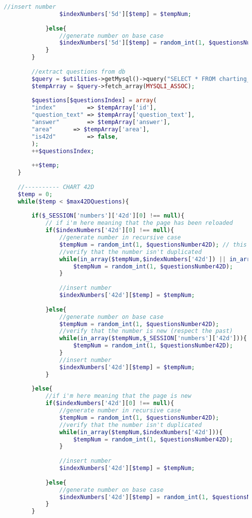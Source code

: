 \begin{lstlisting}[language=php]
				//insert number
				$indexNumbers['5d'][$temp] = $tempNum;
				
			}else{
				//generate number on base case
				$indexNumbers['5d'][$temp] = random_int(1, $questionsNumber5D);
			}
		}
		
		//extract questions from db
		$query = $utilities->getMysql()->query("SELECT * FROM charting_test_5d WHERE (id = '{$indexNumbers['5d'][$temp]}')");
		$tempArray = $query->fetch_array(MYSQLI_ASSOC);  
		
		$questions[$questionsIndex] = array(
		"index"         => $tempArray['id'],
		"question_text" => $tempArray['question_text'],
		"answer"        => $tempArray['answer'],
		"area"		=> $tempArray['area'],
		"is42d"         => false,
		);
		++$questionsIndex;
		
		++$temp;
	}
	
	//---------- CHART 42D
	$temp = 0;
	while($temp < $max42DQuestions){
		
		if($_SESSION['numbers']['42d'][0] !== null){
			// if i'm here meaning that the page has been reloaded     
			if($indexNumbers['42d'][0] !== null){
				//generate number in recursive case
				$tempNum = random_int(1, $questionsNumber42D); // this 1 is because i know that the questions starts form 1 into db
				//verify that the number isn't duplicated
				while(in_array($tempNum,$indexNumbers['42d']) || in_array($tempNum,$_SESSION['numbers']['42d'])){
					$tempNum = random_int(1, $questionsNumber42D);
				}
				
				//insert number
				$indexNumbers['42d'][$temp] = $tempNum; 
				
			}else{
				//generate number on base case
				$tempNum = random_int(1, $questionsNumber42D);
				//verify that the number is new (respect the past)
				while(in_array($tempNum,$_SESSION['numbers']['42d'])){
					$tempNum = random_int(1, $questionsNumber42D);
				}
				//insert number
				$indexNumbers['42d'][$temp] = $tempNum; 
			}
			
		}else{
			//if i'm here meaning that the page is new
			if($indexNumbers['42d'][0] !== null){
				//generate number in recursive case
				$tempNum = random_int(1, $questionsNumber42D);
				//verify that the number isn't duplicated
				while(in_array($tempNum,$indexNumbers['42d'])){
					$tempNum = random_int(1, $questionsNumber42D);
				}
				
				//insert number
				$indexNumbers['42d'][$temp] = $tempNum;
				
			}else{
				//generate number on base case
				$indexNumbers['42d'][$temp] = random_int(1, $questionsNumber42D);
			}
		}
		

\end{lstlisting}
